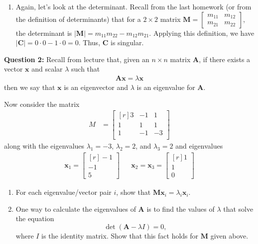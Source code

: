 \documentclass[10pt]{amsart}
\begin{document}
\begin{enumerate}
	\item Again, let's look at the determinant. Recall from the last homework (or from the definition of determinants) that for a $2\times2$ matrix $\mathbf{M} = \left[\begin{matrix}m_{11} & m_{12} \\ m_{21} & m_{22}\end{matrix}\right]$, the determinant is $|\mathbf{M}| = m_{11} m_{22} - m_{12}m_{21}$. Applying this definition, we have $|\mathbf{C}| = 0\cdot0 - 1\cdot0 = 0$. Thus, $\mathbf{C}$ is singular. 
\end{enumerate}


\bigskip


\textbf{Question 2:} Recall from lecture that, given an $n\times n$ matrix $\mathbf{A}$, if there exists a vector $\mathbf{x}$ and scalar $\lambda$ such that 
\begin{eqnarray*}
	\mathbf{A}\mathbf{x} = \lambda \mathbf{x}
\end{eqnarray*}
then we say that $\mathbf{x}$ is an eigenvector and $\lambda$ is an eigenvalue for $\mathbf{A}$. 

Now consider the matrix
\begin{align*}
M &= \left[\begin{matrix*}[r]
3 & -1 & 1 \\
1 & 1 & 1 \\
1 & -1 & -3 \\
\end{matrix*}\right]
\end{align*}
along with the eigenvalues $\lambda_1 = -3$, $\lambda_2 = 2$, and $\lambda_3 = 2$ and eigenvalues 
\begin{align*}
\mathbf{x}_1 = \left[\begin{matrix*}[r]
-1 \\ -1 \\ 5
\end{matrix*}\right]   & &
\mathbf{x}_2 = \mathbf{x}_3 = \left[\begin{matrix*}[r]
1 \\ 1\\ 0
\end{matrix*}\right]
\end{align*}

\begin{enumerate}
	\item For each eigenvalue/vector pair $i$, show that $\mathbf{M} \mathbf{x}_i = \lambda_i \mathbf{x}_i$. 
	
	\item One way to calculate the eigenvalues of $\mathbf{A}$ is to find the values of $\lambda$ that solve the equation $$\det(\mathbf{A} - \lambda I) = 0,$$ where $I$ is the identity matrix. Show that this fact holds for $\mathbf{M}$ given above. 
\end{enumerate}
\end{document}
